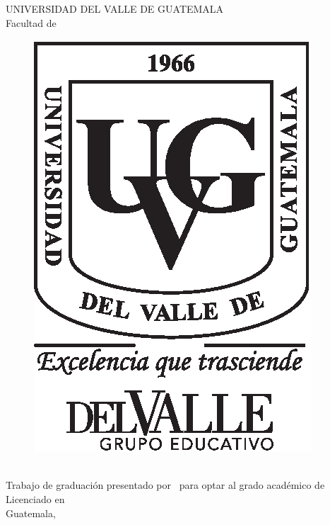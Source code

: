 \documentclass[11pt, letterpaper, twoside, openright]{report}
\newcommand{\blankpage}{
\newpage
\thispagestyle{empty}
\mbox{}
\newpage
}
\begin{document}
\ifdefined\CAPcaratula
	\newpage
	\cleardoublepage{}
	\pagecolor{white}
	\color{black}
	\setcounter{page}{1}
	\thispagestyle{empty}
	\begin{center}
		\LARGE UNIVERSIDAD DEL VALLE DE GUATEMALA\\
		\LARGE Facultad de \uvgfacultad \\[0.75cm]
	\end{center}
	\begin{figure}[h]
		\begin{center}
			\includegraphics[height=5.5 cm]{plantilla/escudoUVGnegro.eps}
			\vspace{0.5in}
		\end{center}
	\end{figure}
	\begin{center}
		\Large \textbf{\nohyphens{\titulotesis}} \\
		\vfill
		\Large \nohyphens{Trabajo de graduación presentado por \nombreestudiante \ para optar al grado académico de Licenciado en \uvgcarrera} \\
		\vfill
		\large Guatemala, \\
		\vspace{1em}
		\anoentrega
	\end{center}

	\ifdefined\printver
		\blankpage
		\blankpage
\end{document}
